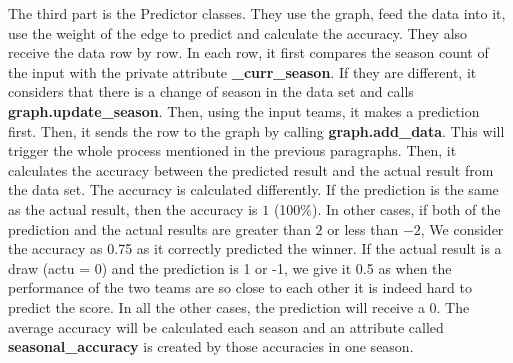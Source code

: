\documentclass[fontsize=11pt]{article}
\begin{document}
\newline
\newline
The third part is the Predictor classes. They use the graph, feed the data into it, use the weight of the edge to predict and calculate the accuracy. They also receive the data row by row. In each row, it first compares the season count of the input with the private attribute \textbf{\_curr\_season}. If they are different, it considers that there is a change of season in the data set and calls \textbf{graph.update\_season}. Then, using the input teams, it makes a prediction first. Then, it sends the row to the graph by calling \textbf{graph.add\_data}. This will trigger the whole process mentioned in the previous paragraphs. Then, it calculates the accuracy between the predicted result and the actual result from the data set. The accuracy is calculated differently. If the prediction is the same as the actual result, then the accuracy is $1$ (100\%). In other cases, if both of the prediction and the actual results are greater than $2$ or less than $-2$, We consider the accuracy as 0.75 as it correctly predicted the winner. If the actual result is a draw (actu = 0) and the prediction is 1 or -1, we give it 0.5 as when the performance of the two teams are so close to each other it is indeed hard to predict the score. In all the other cases, the prediction will receive a 0. The average accuracy will be calculated each season and an attribute called \textbf{seasonal\_accuracy} is created by those accuracies in one season.
\newline
\newline
\end{document}
